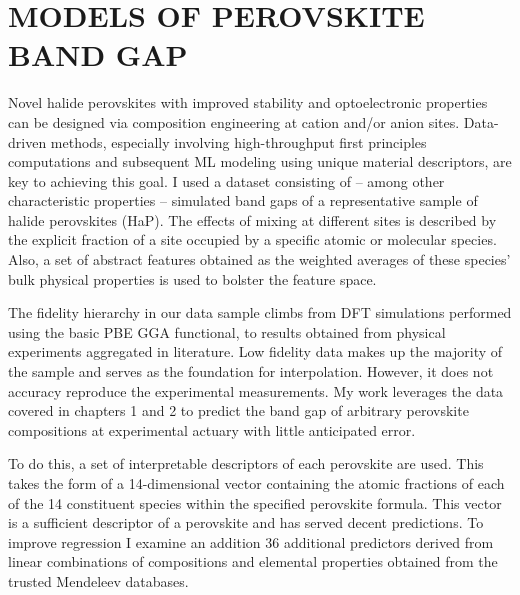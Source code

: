 \chapter{MODELS OF PEROVSKITE BAND GAP}
\label{sec:org37dcca4}
Novel halide perovskites with improved stability and optoelectronic properties can be designed via composition engineering at cation and/or anion sites.
Data-driven methods, especially involving high-throughput first principles computations and subsequent ML modeling using unique material descriptors, are key to achieving this goal.
I used a dataset consisting of -- among other characteristic properties -- simulated band gaps of a representative sample of halide perovskites (HaP).
The effects of mixing at different sites is described by the explicit fraction of a site occupied by a specific atomic or molecular species.
Also, a set of abstract features obtained as the weighted averages of these species' bulk physical properties is used to bolster the feature space.

The fidelity hierarchy in our data sample climbs from DFT simulations performed using the basic PBE GGA functional, to results obtained from physical experiments aggregated in literature.
\autocite{almora-2020-devic-perfor,kim-2014-cdses-nanow,swanson-2017-co-sublim}
Low fidelity data makes up the majority of the sample and serves as the foundation for interpolation.
However, it does not accuracy reproduce the experimental measurements.
My work leverages the data covered in chapters 1 and 2 to predict the band gap of arbitrary perovskite compositions at experimental actuary with little anticipated error.

To do this, a set of interpretable descriptors of each perovskite are used.
This takes the form of a 14-dimensional vector containing the atomic fractions of each of the 14 constituent species within the specified perovskite formula.
This vector is a sufficient descriptor of a perovskite and has served decent predictions.
\autocite{mannodi-kanakkithodi-2022-data-driven}
To improve regression I examine an addition 36 additional predictors derived from linear combinations of compositions and elemental properties obtained from the trusted Mendeleev databases.
\autocite{mentel-2014}

